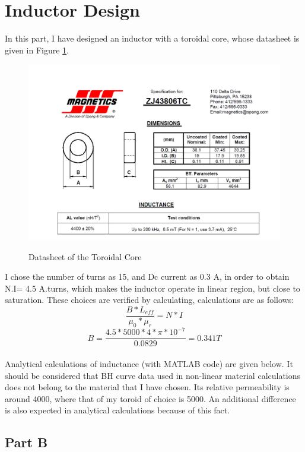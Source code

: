 \section{Inductor Design}

In this part, I have designed an inductor with a toroidal core, whose datasheet is given in Figure \ref{datasheet}. \\

\begin{figure}[H]
\hspace{1.5cm}
\centering\includegraphics[width=4.5in]{datasheet.PNG}\\
\caption{Datasheet of the Toroidal Core}
\label{datasheet}
\end{figure} 


I chose the number of turns as 15, and Dc current as 0.3 A, in order to obtain N.I= 4.5 A.turns, which makes the inductor operate in linear region, but close to saturation. These choices are verified by calculating, calculations are as follows:\\

$$\dfrac{B*L_{eff}}{\mu_{0}*\mu_r}=N*I$$
$$B=\dfrac{4.5*5000*4*\pi*10^{-7}}{0.0829}=0.341 T$$
\\

Analytical calculations of inductance (with MATLAB code) are given below. It should be considered that BH curve data used in non-linear material calculations does not belong to the material that I have chosen. Its relative permeability is around 4000, where that of my toroid of choice is 5000. An additional difference is also expected in analytical calculations because of this fact.\\ 



\subsection*{Part B}

